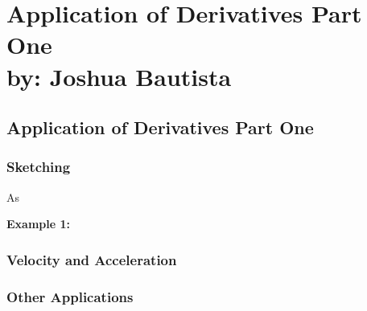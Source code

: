 \documentclass[12pt,fleqn]{book} %
\begin{document}
\part{Application of Derivatives Part One\\ by: Joshua Bautista}


\chapter{Application of Derivatives Part One}



\vspace*{-10mm}

\section{Sketching}

As

\noindent\textbf{Example 1:}

\begin{center}

\end{center}


\section{Velocity and Acceleration}



\section{Other Applications}

\begin{center}

\end{center}
\end{document}
